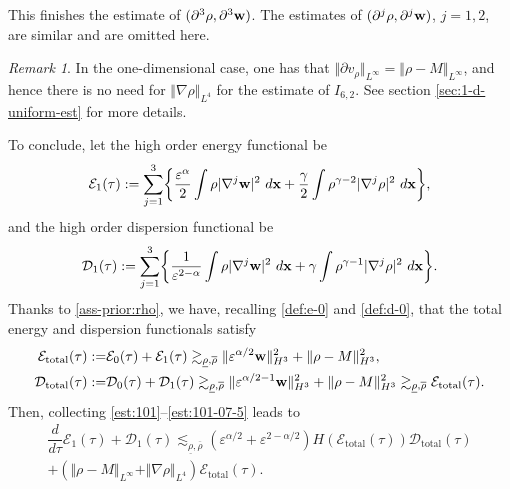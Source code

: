 \documentclass[11pt]{article}
\theoremstyle{plain}
\theoremstyle{definition}
\theoremstyle{remark}
\newtheorem{remark}[theorem]{Remark}
\newcommand{\mrm}[1]{\mathrm{#1}}
\renewcommand{\vec}[1]{{\bf #1}}
\newcommand{\idx}{\ d\vec x}
\newcommand{\norm}[2]{\Vert #1 \Vert_{#2}}
\numberwithin{equation}{section}
\begin{document}
This finishes the estimate of $ (\partial^3 \rho, \partial^3 \vec w) $. The estimates of $ (\partial^j \rho, \partial^j \vec w) $, $ j =1,2 $, are similar and are omitted here. 

\begin{remark}
    In the one-dimensional case, one has that $ \norm{\partial v_\rho}{L^\infty} = \norm{\rho - M}{L^\infty} $, and hence there is no need for $ \norm{\nabla \rho}{L^4} $ for the estimate of $ I_{6,2} $. See section \ref{sec:1-d-uniform-est} for more details. 
\end{remark}

To conclude, let the high order energy functional be
\begin{equation}
    \label{def:e-1} 
    \mathcal E_1(\tau) := \sum_{j=1}^{3} \biggl\lbrace \frac{\varepsilon^\alpha}{2} \int \rho \vert \nabla^j \vec w \vert^2 \idx + \frac{\gamma}{2} \int \rho^{\gamma-2} \vert \nabla^j \rho \vert^2 \idx \biggr\rbrace,
\end{equation}
and the high order dispersion functional be
\begin{equation}
    \label{def:d-1}
    \mathcal D_1(\tau) := \sum_{j=1}^{3} \biggl\lbrace \frac{1}{\varepsilon^{2-\alpha}} \int \rho \vert \nabla^j \vec w \vert^2 \idx + \gamma \int \rho^{\gamma-1} \vert \nabla^j \rho \vert^2 \idx \biggr\rbrace. 
\end{equation}
Thanks to \eqref{ass-prior:rho}, we have, recalling \eqref{def:e-0} and \eqref{def:d-0}, that the total energy and dispersion functionals satisfy
\begin{align}
    \label{est:201}
    \mathcal E_\mrm{total}(\tau) := & \mathcal E_0(\tau) + \mathcal E_1(\tau) \gtrsim_{\underline \rho, \overline \rho} \norm{\varepsilon^{\alpha/2} \vec w}{H^3}^2 + \norm{\rho - M}{H^3}^2, \\
    \label{est:202}
    \mathcal D_\mrm{total}(\tau) := & \mathcal D_0(\tau) + \mathcal D_1(\tau) \gtrsim_{\underline\rho, \overline\rho} \norm{\varepsilon^{\alpha/2-1}\vec w}{H^3}^2 + \norm{\rho - M}{H^3}^2 \gtrsim_{\underline\rho,\overline\rho} \mathcal E_\mrm{total}(\tau).
\end{align}
Then, collecting \eqref{est:101}--\eqref{est:101-07-5} leads to 
\begin{equation}
    \label{ene:203}
    \begin{gathered}
        \dfrac{d}{d\tau} \mathcal E_1(\tau) + \mathcal D_1 (\tau) \lesssim_{\underline\rho, \overline\rho} (\varepsilon^{\alpha/2} + \varepsilon^{2-\alpha/2}) H(\mathcal E_\mrm{total}(\tau))\mathcal D_\mrm{total}(\tau) \\
        + (\norm{\rho-M}{L^\infty} + \norm{\nabla \rho}{L^4}) \mathcal E_\mrm{total}(\tau).
    \end{gathered}
\end{equation}
\end{document}
